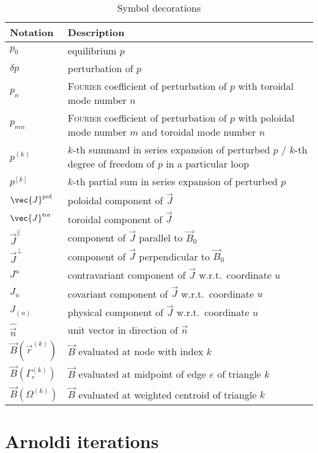 \begin{longtable}{l >{\RaggedRight}p{}}
  \caption{Symbol decorations} \\
  \toprule
  \textbf{Notation} & \textbf{Description} \\
  \midrule
  \endhead
  \label{tab:decorations}%
  $p_{0}$ & equilibrium $p$ \\
  $\delta p$ & perturbation of $p$ \\
  $p_{n}$ & \textsc{Fourier} coefficient of perturbation of $p$ with toroidal mode number $n$ \\
  $p_{m n}$ & \textsc{Fourier} coefficient of perturbation of $p$ with poloidal mode number $m$ and toroidal mode number $n$ \\
  $p^{(k)}$ & $k$-th summand in series expansion of perturbed $p$ / $k$-th degree of freedom of $p$ in a particular loop \\
  $p^{[k]}$ & $k$-th partial sum in series expansion of perturbed $p$ \\
  \midrule
  $\vec{J}^{\pol}$ & poloidal component of $\vec{J}$ \\
  $\vec{J}^{\tor}$ & toroidal component of $\vec{J}$ \\
  $\vec{J}^{\parallel}$ & component of $\vec{J}$ parallel to $\vec{B}_{0}$ \\
  $\vec{J}^{\perp}$ & component of $\vec{J}$ perpendicular to $\vec{B}_{0}$ \\
  $J^{u}$ & contravariant component of $\vec{J}$ w.r.t.\ coordinate $u$ \\
  $J_{u}$ & covariant component of $\vec{J}$ w.r.t.\ coordinate $u$ \\
  $J_{(u)}$ & physical component of $\vec{J}$ w.r.t.\ coordinate $u$ \\
  $\hat{\vec{n}}$ & unit vector in direction of $\vec{n}$ \\
  \midrule
  $\vec{B} (\vec{r}^{(k)})$ & $\vec{B}$ evaluated at node with index $k$ \\
  $\vec{B} (\Gamma_{e}^{(k)})$ & $\vec{B}$ evaluated at midpoint of edge $e$ of triangle $k$ \\
  $\vec{B} (\Omega^{(k)})$ & $\vec{B}$ evaluated at weighted centroid of triangle $k$ \\
  \bottomrule
\end{longtable}

\section{Arnoldi iterations}
\label{app:Arnoldi}

